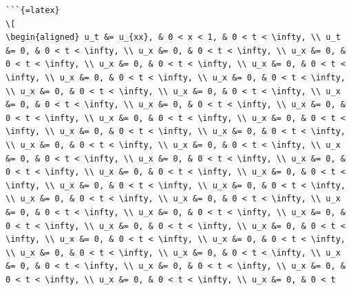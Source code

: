 \documentclass[
]{article}
\begin{document}
\begin{verbatim}
```{=latex}
\[
\begin{aligned} u_t &= u_{xx}, & 0 < x < 1, & 0 < t < \infty, \\ u_t &= 0, & 0 < t < \infty, \\ u_x &= 0, & 0 < t < \infty, \\ u_x &= 0, & 0 < t < \infty, \\ u_x &= 0, & 0 < t < \infty, \\ u_x &= 0, & 0 < t < \infty, \\ u_x &= 0, & 0 < t < \infty, \\ u_x &= 0, & 0 < t < \infty, \\ u_x &= 0, & 0 < t < \infty, \\ u_x &= 0, & 0 < t < \infty, \\ u_x &= 0, & 0 < t < \infty, \\ u_x &= 0, & 0 < t < \infty, \\ u_x &= 0, & 0 < t < \infty, \\ u_x &= 0, & 0 < t < \infty, \\ u_x &= 0, & 0 < t < \infty, \\ u_x &= 0, & 0 < t < \infty, \\ u_x &= 0, & 0 < t < \infty, \\ u_x &= 0, & 0 < t < \infty, \\ u_x &= 0, & 0 < t < \infty, \\ u_x &= 0, & 0 < t < \infty, \\ u_x &= 0, & 0 < t < \infty, \\ u_x &= 0, & 0 < t < \infty, \\ u_x &= 0, & 0 < t < \infty, \\ u_x &= 0, & 0 < t < \infty, \\ u_x &= 0, & 0 < t < \infty, \\ u_x &= 0, & 0 < t < \infty, \\ u_x &= 0, & 0 < t < \infty, \\ u_x &= 0, & 0 < t < \infty, \\ u_x &= 0, & 0 < t < \infty, \\ u_x &= 0, & 0 < t < \infty, \\ u_x &= 0, & 0 < t < \infty, \\ u_x &= 0, & 0 < t < \infty, \\ u_x &= 0, & 0 < t < \infty, \\ u_x &= 0, & 0 < t < \infty, \\ u_x &= 0, & 0 < t < \infty, \\ u_x &= 0, & 0 < t < \infty, \\ u_x &= 0, & 0 < t < \infty, \\ u_x &= 0, & 0 < t < \infty, \\ u_x &= 0, & 0 < t < \infty, \\ u_x &= 0, & 0 < t < \infty, \\ u_x &= 0, & 0 < t < \infty, \\ u_x &= 0, & 0 < t 
\end{verbatim}
\end{document}
